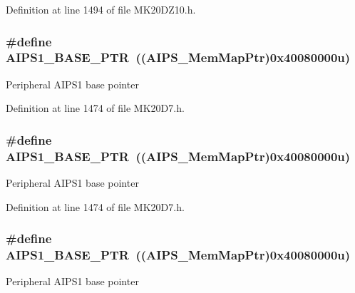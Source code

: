 Definition at line 1494 of file M\+K20\+D\+Z10.\+h.

\subsubsection[{\texorpdfstring{A\+I\+P\+S1\+\_\+\+B\+A\+S\+E\+\_\+\+P\+TR}{AIPS1_BASE_PTR}}]{\setlength{\rightskip}{0pt plus 5cm}\#define A\+I\+P\+S1\+\_\+\+B\+A\+S\+E\+\_\+\+P\+TR~(({\bf A\+I\+P\+S\+\_\+\+Mem\+Map\+Ptr})0x40080000u)}\hypertarget{group___a_i_p_s___peripheral_gab38278851053aa66f9683ed8707e23bc}{}\label{group___a_i_p_s___peripheral_gab38278851053aa66f9683ed8707e23bc}
Peripheral A\+I\+P\+S1 base pointer 

Definition at line 1474 of file M\+K20\+D7.\+h.

\subsubsection[{\texorpdfstring{A\+I\+P\+S1\+\_\+\+B\+A\+S\+E\+\_\+\+P\+TR}{AIPS1_BASE_PTR}}]{\setlength{\rightskip}{0pt plus 5cm}\#define A\+I\+P\+S1\+\_\+\+B\+A\+S\+E\+\_\+\+P\+TR~(({\bf A\+I\+P\+S\+\_\+\+Mem\+Map\+Ptr})0x40080000u)}\hypertarget{group___a_i_p_s___peripheral_gab38278851053aa66f9683ed8707e23bc}{}\label{group___a_i_p_s___peripheral_gab38278851053aa66f9683ed8707e23bc}
Peripheral A\+I\+P\+S1 base pointer 

Definition at line 1474 of file M\+K20\+D7.\+h.

\subsubsection[{\texorpdfstring{A\+I\+P\+S1\+\_\+\+B\+A\+S\+E\+\_\+\+P\+TR}{AIPS1_BASE_PTR}}]{\setlength{\rightskip}{0pt plus 5cm}\#define A\+I\+P\+S1\+\_\+\+B\+A\+S\+E\+\_\+\+P\+TR~(({\bf A\+I\+P\+S\+\_\+\+Mem\+Map\+Ptr})0x40080000u)}\hypertarget{group___a_i_p_s___peripheral_gab38278851053aa66f9683ed8707e23bc}{}\label{group___a_i_p_s___peripheral_gab38278851053aa66f9683ed8707e23bc}
Peripheral A\+I\+P\+S1 base pointer 

